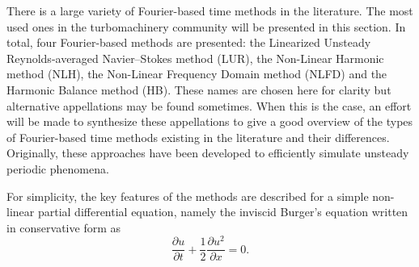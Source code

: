 
There is a large variety of Fourier-based time methods in the
literature. 
The most used ones in the turbomachinery community will be presented in this section.
In total, four Fourier-based methods are presented: 
the Linearized Unsteady Reynolds-averaged Navier--Stokes method (LUR), 
the Non-Linear Harmonic method (NLH), 
the Non-Linear Frequency Domain method (NLFD) 
and the Harmonic Balance method (HB).
These names are chosen here
for clarity but alternative appellations may be found sometimes. 
When this is the case, an effort will be made to synthesize
these appellations to give a good 
overview of the types of Fourier-based time methods existing in the literature
and their differences. Originally, these approaches have been developed
to efficiently simulate unsteady periodic phenomena.

For simplicity, the key features of the methods are described for
a simple non-linear partial differential equation, namely
the inviscid Burger's equation written in conservative form as
\begin{equation}
  \frac{\partial u}{\partial t} + 
  \frac{1}{2} \frac{\partial u^2}{\partial x} = 
  0.
  \label{eq:sm_nonlinear_convection_conservative}
\end{equation}
